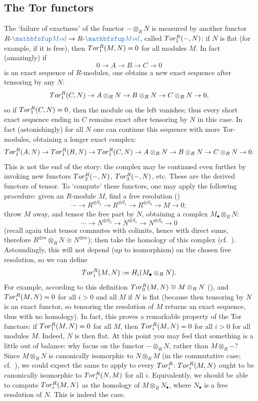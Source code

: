 \subsection{The Tor functors}%
\label{subsec:linrep:the-tor-functors}
The `failure of exactness' of the functor $\mathord{-} \otimes_R N$ is
measured by another functor
$R\text{-}\categ{Mod} \to R\text{-}\categ{Mod}$, called
$Tor^R_1(\mathord{-}, N)$: if $N$ is flat (for example, if it is
free), then $Tor^R_1(M, N) = 0$ for all modules $M$. In fact
(amazingly) if
\[
  0 \to A \to B \to C \to 0
\]
is an exact sequence of $R$-modules, one obtains a new exact sequence
after tensoring by any $N$:
\[
  Tor^R_1(C, N) \to A \otimes_R N \to B \otimes_R N \to C \otimes_R N
  \to 0,
\]
so if $Tor^R_1(C, N) = 0$, then the module on the left vanishes; thus
every short exact sequence ending in $C$ remains exact after tensoring
by $N$ in this case. In fact (astonishingly) for all $N$ one can
continue this sequence with more Tor-modules, obtaining a longer exact
complex:
\[
  Tor^R_1(A, N) \to Tor^R_1(B, N) \to Tor^R_1(C, N) \to A \otimes_R
  N \to B \otimes_R N \to C \otimes_R N \to 0.
\]
This is not the end of the story: the complex may be continued even
further by invoking new functors $Tor^R_2(\mathord{-}, N)$,
$Tor^R_3(\mathord{-}, N)$, etc. These are the derived functors of
tensor. To `compute' these functors, one may apply the following
procedure: given an $R$-module $M$, find a free resolution
()
\[
  \cdots \to R^{\oplus S_2} \to R^{\oplus S_1} \to R^{\oplus S_0} \to
  M \to 0;
\]
throw $M$ away, and tensor the free part by $N$, obtaining a complex
$M_\bullet \otimes_R N$:
\[
  \cdots \to N^{\oplus S_2} \to N^{\oplus S_1} \to N^{\oplus S_0} \to
  0
\]
(recall again that tensor commutes with colimits, hence with direct
sums, therefore $R^{\oplus m} \otimes_R N \cong N^{\oplus m}$); then
take the homology of this complex (cf.\
). Astoundingly,
this will not depend (up to isomorphism) on the chosen free
resolution, so we can define
\[
  Tor^R_i(M, N) := H_i(M_\bullet \otimes_R N).
\]
For example, according to this definition
$Tor^R_0(M, N) \cong M \otimes_R N$
(), and
$Tor^R_i(M, N) = 0$ for all $i > 0$ and all $M$ if $N$ is flat
(because then tensoring by $N$ is an exact functor, so tensoring the
resolution of $M$ returns an exact sequence, thus with no
homology). In fact, this proves a remarkable property of the Tor
functors: if $Tor^R_1(M, N) = 0$ for all $M$, then
$Tor^R_i(M, N) = 0$ for all $i > 0$ for all modules $M$.  Indeed, $N$
is then flat.  At this point you may feel that something is a little
out of balance: why focus on the functor $\mathord{-} \otimes_R N$,
rather than $M \otimes_R \mathord{-}$?  Since $M \otimes_R N$ is
canonically isomorphic to $N \otimes_R M$ (in the commutative case;
cf.\ \Cref{exam:linrep:tensor-with-base-ring-is-identity}), we could expect the same to apply to
every $Tor^R_i$: $Tor^R_i(M, N)$ ought to be canonically isomorphic
to $Tor^R_i(N, M)$ for all $i$. Equivalently, we should be able to
compute $Tor^R_i(M, N)$ as the homology of $M \otimes_R N_\bullet$,
where $N_\bullet$ is a free resolution of $N$.  This is indeed the
case.

